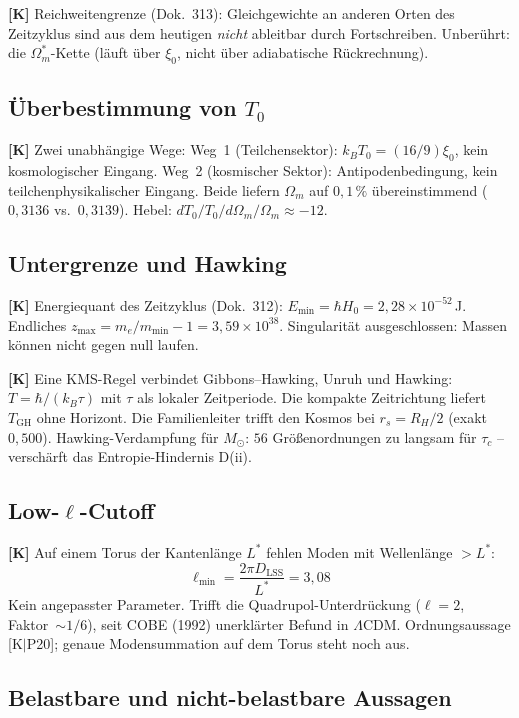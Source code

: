 \textbf{[K]} Reichweitengrenze (Dok.~313): Gleichgewichte an anderen
Orten des Zeitzyklus sind aus dem heutigen \emph{nicht} ableitbar
durch Fortschreiben. Unberührt: die $\Omega_m^*$-Kette (läuft über
$\xi_0$, nicht über adiabatische Rückrechnung).

\subsection{Überbestimmung von $T_0$}

\textbf{[K]} Zwei unabhängige Wege:
Weg~1 (Teilchensektor): $k_BT_0 = (16/9)\xi_0$, kein kosmologischer Eingang.
Weg~2 (kosmischer Sektor): Antipodenbedingung, kein teilchenphysikalischer Eingang.
Beide liefern $\Omega_m$ auf $0{,}1\,\%$ übereinstimmend
($0{,}3136$ vs.\ $0{,}3139$).
Hebel: $dT_0/T_0 \big/ d\Omega_m/\Omega_m \approx -12$.

\subsection{Untergrenze und Hawking}

\textbf{[K]} Energiequant des Zeitzyklus (Dok.~312):
$E_\text{min} = \hbar H_0 = 2{,}28\times10^{-52}$\,J.
Endliches $z_\text{max} = m_e/m_\text{min} - 1 = 3{,}59\times10^{38}$.
Singularität ausgeschlossen: Massen können nicht gegen null laufen.

\textbf{[K]} Eine KMS-Regel verbindet Gibbons--Hawking, Unruh und
Hawking: $T = \hbar/(k_B\tau)$ mit $\tau$ als lokaler Zeitperiode.
Die kompakte Zeitrichtung liefert $T_\text{GH}$ ohne Horizont.
Die Familienleiter trifft den Kosmos bei $r_s = R_H/2$ (exakt $0{,}500$).
Hawking-Verdampfung für $M_\odot$: $56$ Größenordnungen zu langsam
für $\tau_c$ – verschärft das Entropie-Hindernis D(ii).

\subsection{Low-$\ell$-Cutoff}

\textbf{[K]} Auf einem Torus der Kantenlänge $L^*$ fehlen Moden mit
Wellenlänge $> L^*$:
\[
\ell_\text{min} = \frac{2\pi D_\text{LSS}}{L^*} = 3{,}08
\]
Kein angepasster Parameter. Trifft die Quadrupol-Unterdrückung
($\ell = 2$, Faktor~$\sim 1/6$), seit COBE (1992) unerklärter Befund
in $\Lambda$CDM. Ordnungsaussage [K$|$P20]; genaue Modensummation
auf dem Torus steht noch aus.

\subsection{Belastbare und nicht-belastbare Aussagen}

